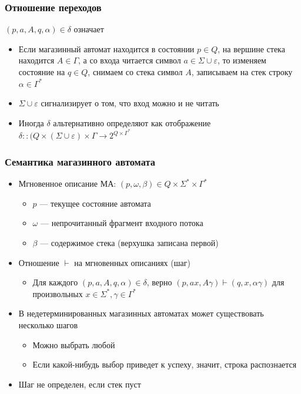 \documentclass{beamer}
\begin{document}
\begin{frame}[fragile]
  \transwipe[direction=90]
  \frametitle{Отношение переходов}
  $(p, a, A, q, \alpha) \in \delta$  означает
  \begin{itemize}
    \item Если магазинный автомат находится в состоянии $p \in Q$, на вершине стека находится $A \in \Gamma$, а со входа читается символ $a \in \Sigma \cup \varepsilon$, то изменяем состояние на $q \in Q$, снимаем со стека символ $A$, записываем на стек строку $\alpha \in \Gamma^*$
    \item $\Sigma \cup \varepsilon$ сигнализирует о том, что вход можно и не читать
    \item Иногда $\delta$ альтернативно определяют как отображение $\delta :: (Q \times (\Sigma \cup \varepsilon) \times \Gamma \rightarrow 2^{Q \times \Gamma^*}$
  \end{itemize}
\end{frame}

\begin{frame}[fragile]
  \transwipe[direction=90]
  \frametitle{Семантика магазинного автомата}
\begin{itemize}
  \item Мгновенное описание МА: $(p, \omega, \beta) \in Q \times \Sigma^* \times \Gamma^*$
  \begin{itemize}
  	\item $p$ --- текущее состояние автомата
  	\item $\omega$ --- непрочитанный фрагмент входного потока
  	\item $\beta$ --- содержимое стека (верхушка записана первой)
  \end{itemize}    
  \item Отношение $\vdash$ на мгновенных описаниях (шаг)
  \begin{itemize}
  	\item Для каждого $(p, a, A, q, \alpha) \in \delta$, верно $(p, a x, A \gamma) \vdash (q, x, \alpha \gamma)$ для произвольных $x \in \Sigma^*, \gamma \in \Gamma^*$
  \end{itemize}
  \item В недетерминированных магазинных автоматах может существовать несколько шагов
  \begin{itemize}
    \item Можно выбрать любой
    \item Если какой-нибудь выбор приведет к успеху, значит, строка распознается
  \end{itemize}
  \item Шаг не определен, если стек пуст
\end{itemize}

\end{frame}
\end{document}
